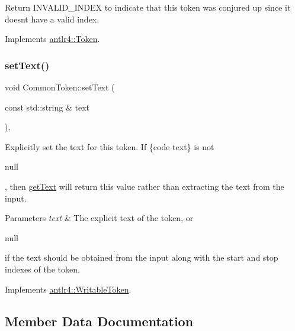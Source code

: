 Return I\+N\+V\+A\+L\+I\+D\+\_\+\+I\+N\+D\+EX to indicate that this token was conjured up since it doesn\textquotesingle{}t have a valid index. 

Implements \hyperlink{classantlr4_1_1Token_aaa5bda604b301abc3a84bc0f477750d5}{antlr4\+::\+Token}.

\mbox{\label{classantlr4_1_1CommonToken_a2963f31fa12fdb1c5c26711004177554}} 
\subsubsection{\texorpdfstring{set\+Text()}{setText()}}
{\footnotesize\ttfamily void Common\+Token\+::set\+Text (\begin{DoxyParamCaption}\item[{const std\+::string \&}]{text }\end{DoxyParamCaption})\hspace{0.3cm}{\ttfamily [override]}, {\ttfamily [virtual]}}

Explicitly set the text for this token. If \{code text\} is not 
\begin{DoxyCode}
null 
\end{DoxyCode}
 , then \hyperlink{classantlr4_1_1CommonToken_abd1d06568aa3d4aa0180b9ca316ecfcd}{get\+Text} will return this value rather than extracting the text from the input.


\begin{DoxyParams}{Parameters}
{\em text} & The explicit text of the token, or
\begin{DoxyCode}
null 
\end{DoxyCode}
 if the text should be obtained from the input along with the start and stop indexes of the token. \\
\hline
\end{DoxyParams}


Implements \hyperlink{classantlr4_1_1WritableToken}{antlr4\+::\+Writable\+Token}.



\subsection{Member Data Documentation}
\mbox{\label{classantlr4_1_1CommonToken_ad3083101ad942a5c64e0c97e08e5e431}} 
